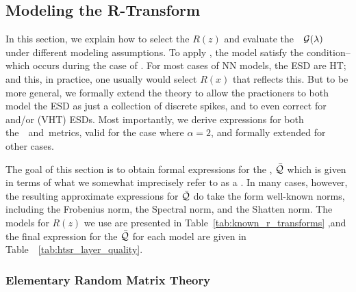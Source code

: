 \subsection{Modeling the R-Transform}
\label{sxn:r_transforms}

In this section, we explain how to select the \RTransform $R(z)$ and evaluate the~\GEN~$\mathcal{G(\lambda)}$ under different modeling assumptions.
To apply \SETOL, the model satisfy the \TRACELOG condition--which occurs during the case of  \IdealLearning.
For most cases of NN models, the ESD are HT; and this, in practice, one usually would select $R(x)$ that reflects this.
But to be more general, we formally extend the theory to allow the practioners to
both model the ESD as just a collection of discrete spikes, and to even correct for
\CorrelationTraps and/or \VeryHeavyTailed (VHT) ESDs.
Most importantly,  we derive expressions for both the~\WW~\ALPHA and~\ALPHAHAT metrics, valid
for the case \IdealLearning where $\alpha=2$, and formally extended for other cases.

The goal of this section is to obtain formal expressions for the \LayerQuality, $\bar{\mathcal{Q}}$ which is
given in terms of what we somewhat imprecisely refer to as a \GEN.
In many cases, however, the resulting approximate expressions for $\bar{\mathcal{Q}}$ do take the
form well-known norms, including the Frobenius norm, the Spectral norm, and the Shatten norm.
The models for $R(z)$  we use are presented in Table~\ref{tab:known_r_transforms} ,and
the final expression for the \LayerQuality $\bar{\mathcal{Q}}$ for each model are given in Table~~\ref{tab:htsr_layer_quality}.

\subsubsection{Elementary Random Matrix Theory}
\label{sxn:r_transforms:elementary_rmt}

